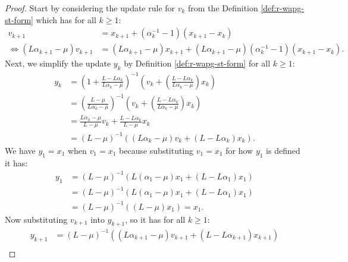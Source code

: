 \documentclass[12pt]{article}
\begin{document}
    \begin{proof}
        Start by considering the update rule for $v_k$ from the Definition \ref{def:r-wapg-st-form} which has for all $k \ge 1$: 
        \begin{align*}
            v_{k + 1} &= 
            x_{k + 1} + (\alpha_k^{-1} - 1)(x_{k + 1} - x_k)
            \\
            \iff 
            (L \alpha_{k + 1} - \mu)v_{k + 1} 
            &= 
            (L \alpha_{k + 1} - \mu)x_{k + 1} + (L\alpha_{k + 1} - \mu)(\alpha_k^{-1} - 1)(x_{k + 1} - x_k). 
        \end{align*}
        Next, we simplify the update $y_{k}$ by Definition \ref{def:r-wapg-st-form} for all $k \ge 1$: 
        \begin{align*}
            y_k &= 
            \left(
                1 + \frac{L - L\alpha_k}{L\alpha_k - \mu}
            \right)^{-1}
            \left(
                v_k + 
                \left(\frac{L - L\alpha_k}{L\alpha_k - \mu} \right) x_k
            \right)
            \\
            &= 
            \left(
            \frac{L - \mu}{L\alpha_k - \mu} 
            \right)^{-1}
            \left(
                v_k + 
                \left(\frac{L - L\alpha_k}{L\alpha_k - \mu} \right) x_k
            \right)
            \\
            &= 
            \frac{L\alpha_k - \mu}{L - \mu} v_k
            + 
            \frac{L - L \alpha_k}{L - \mu} x_k
            \\
            &= (L - \mu)^{-1}((L \alpha_k - \mu)v_k + (L - L \alpha_k)x_k). 
        \end{align*}
        We have $y_1 = x_1$ when $v_1 = x_1$ because substituting $v_1 = x_1$ for how $y_1$ is defined it has: 
        \begin{align*}
            y_1 &= (L - \mu)^{-1}(L(\alpha_1 - \mu)x_1 + (L - L\alpha_1)x_1)
            \\
            &= (L - \mu)^{-1}(L(\alpha_1 - \mu)x_1 + (L - L \alpha_1)x_1)
            \\
            &= (L - \mu)^{-1}((L - \mu)x_1) = x_1. 
        \end{align*}
        Now substituting $v_{k + 1}$ into $y_{k + 1}$, so it has for all $k\ge 1$: 
        {\small
        \begin{align*}
            y_{k + 1} &= 
            (L - \mu)^{-1}((L\alpha_{k + 1} - \mu)v_{k + 1} + (L - L \alpha_{k + 1})x_{k + 1})
            \\

\end{align*}}
\end{proof}
\end{document}
